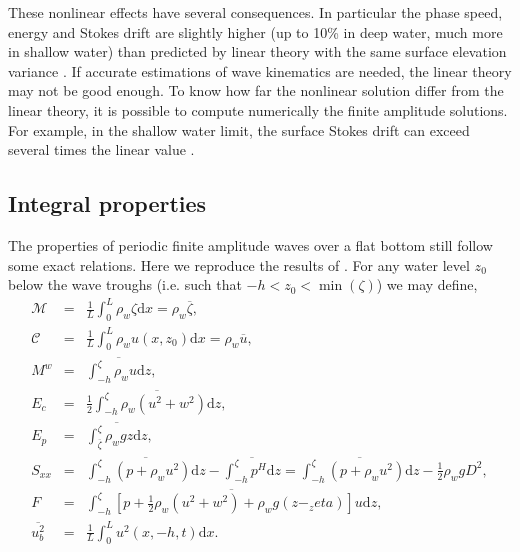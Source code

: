 These nonlinear effects have several consequences. In particular the phase speed, energy and Stokes drift are slightly higher (up to 10\% in deep water, much more in shallow water) than predicted 
by linear theory with the same surface elevation variance  \citep{Cokelet1977}. If accurate estimations of wave kinematics are needed, the linear theory may 
not be good enough. To know how far the nonlinear solution differ from the linear theory, it is possible to compute numerically the finite amplitude solutions. 
For example, in the shallow water limit, the surface Stokes drift can exceed several times the linear value \citep{Ardhuin&al.2008}.



\subsection{Integral properties}
The properties of periodic finite amplitude waves over a flat bottom still follow some exact relations. Here we reproduce the results of  \citep{Cokelet1977}. For any water level  $z_0$ below the wave troughs (i.e. such that  $-h <z_0 < \min(\zeta)$) we may define, 
\begin{eqnarray}
\mathcal{M}&=&\frac{1}{L}\int_0^{L} \rho_w \zeta {\mathrm d}x =
\rho_w \overline{\zeta}, \\
\mathcal{C}&=&\frac{1}{L}\int_0^{L} \rho_w u(x,z_0) {\mathrm d}x =
\rho_w \overline{u}, \\
M^w&=&\overline{\int_{-h}^{\zeta} \rho_w u {\mathrm d}z}, \\
E_c&=&\frac{1}{2}\overline{\int_{-h}^{\zeta} \rho_w \left(u^2+w^2\right) {\mathrm d}z}, \\
E_p&=& \overline{\int_{\overline{\zeta}}^{\zeta} \rho_w g z  {\mathrm d}z}, \\
S_{xx}&=&\overline{\int_{-h}^{\zeta} \left(p + \rho_w u^2\right)
{\mathrm d}z} -\overline{\int_{-h}^{\zeta} p^H {\mathrm d}z} =
\overline{\int_{-h}^{\zeta} \left(p + \rho_w u^2\right) {\mathrm
d}z} - \frac{1}{2} \rho_w g D^2, \\
F&=&\overline{\int_{-h}^{\zeta} \left[p + \frac{1}{2}\rho_w
\left(u^2+w^2\right)+\rho_w g \left(z-_zeta\right) \right] u
{\mathrm
d}z},\\
\overline{u_b^2}&=&\frac{1}{L}\int_0^{L} u^2\left(x,-h,t\right)
{\mathrm d}x.
\end{eqnarray}

